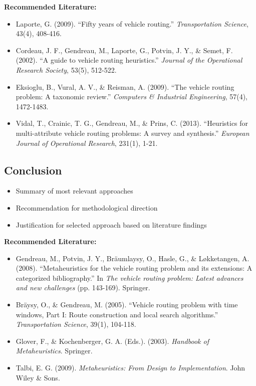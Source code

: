 \noindent\textbf{Recommended Literature:}
\begin{itemize}
    \item Laporte, G. (2009). ``Fifty years of vehicle routing.'' \textit{Transportation Science}, 43(4), 408-416.
    \item Cordeau, J. F., Gendreau, M., Laporte, G., Potvin, J. Y., \& Semet, F. (2002). ``A guide to vehicle routing heuristics.'' \textit{Journal of the Operational Research Society}, 53(5), 512-522.
    \item Eksioglu, B., Vural, A. V., \& Reisman, A. (2009). ``The vehicle routing problem: A taxonomic review.'' \textit{Computers \& Industrial Engineering}, 57(4), 1472-1483.
    \item Vidal, T., Crainic, T. G., Gendreau, M., \& Prins, C. (2013). ``Heuristics for multi-attribute vehicle routing problems: A survey and synthesis.'' \textit{European Journal of Operational Research}, 231(1), 1-21.
\end{itemize}

\subsection{Conclusion}
\begin{itemize}
    \item Summary of most relevant approaches
    \item Recommendation for methodological direction
    \item Justification for selected approach based on literature findings
\end{itemize}

\noindent\textbf{Recommended Literature:}
\begin{itemize}
    \item Gendreau, M., Potvin, J. Y., Bräumlaysy, O., Hasle, G., \& Løkketangen, A. (2008). ``Metaheuristics for the vehicle routing problem and its extensions: A categorized bibliography.'' In \textit{The vehicle routing problem: Latest advances and new challenges} (pp. 143-169). Springer.
    \item Bräysy, O., \& Gendreau, M. (2005). ``Vehicle routing problem with time windows, Part I: Route construction and local search algorithms.'' \textit{Transportation Science}, 39(1), 104-118.
    \item Glover, F., \& Kochenberger, G. A. (Eds.). (2003). \textit{Handbook of Metaheuristics}. Springer.
    \item Talbi, E. G. (2009). \textit{Metaheuristics: From Design to Implementation}. John Wiley \& Sons.
\end{itemize}
